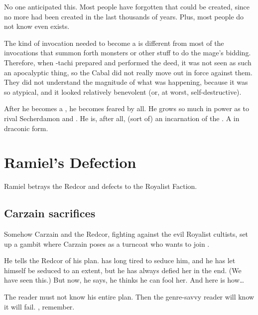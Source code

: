 No one anticipated this. 
Most people have forgotten that \shaeeroth{} could be created, since {no more had been created} in the last thousands of years. 
Plus, most people do not know \Vizsherioch{} even exists. 

The kind of invocation needed to become a \shaeeroth{} is different from most of the invocations that summon forth monsters or other stuff to do the mage's bidding. 
Therefore, when \Vizsherioch-tachi prepared and performed the deed, it was not seen as such an apocalyptic thing, so the Cabal did not really move out in force against them. 
They did not understand the magnitude of what was happening, because it was so atypical, and it looked relatively benevolent (or, at worst, self-destructive). 

After he becomes a \shaeeroth, he becomes feared by all.
He grows so much in power as to rival Secherdamon and \Ishnaruchaefir. 
He is, after all, (sort of) an incarnation of the \xs. A \xs in draconic form.















\section{Ramiel's Defection}
Ramiel betrays the Redcor and defects to the Royalist Faction. 







\subsection{Carzain sacrifices \Racel} 
Somehow Carzain and the Redcor, fighting against the evil Royalist cultists, set up a gambit where Carzain poses as a turncoat who wants to join \Belzir. 

He tells the Redcor of his plan. 
\Belzir{} has long tired to seduce him, and he has let himself be seduced to an extent, but he has always defied her in the end. 
(We have seen this.) 
But now, he says, he thinks he can fool her. 
And here is how\ldots{} 

The reader must not know his entire plan. 
Then the genre-savvy reader will know it will fail. 
, remember. 

